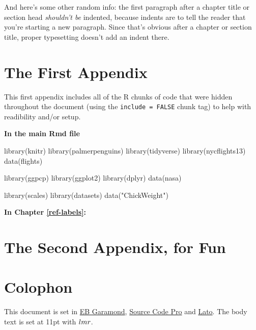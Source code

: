 \documentclass[print]{nuthesis}
\newenvironment{Shaded}{\begin{snugshade}}{\end{snugshade}}
\newcommand{\FunctionTok}[1]{\textcolor[rgb]{0.00,0.00,0.00}{#1}}
\newcommand{\NormalTok}[1]{#1}
\newcommand{\StringTok}[1]{\textcolor[rgb]{0.31,0.60,0.02}{#1}}
\begin{document}
And here's some other random info: the first paragraph after a chapter title or section head \emph{shouldn't be} indented, because indents are to tell the reader that you're starting a new paragraph. Since that's obvious after a chapter or section title, proper typesetting doesn't add an indent there.

\appendix

\hypertarget{the-first-appendix}{%
\chapter{The First Appendix}\label{the-first-appendix}}

This first appendix includes all of the R chunks of code that were hidden throughout the document (using the \texttt{include\ =\ FALSE} chunk tag) to help with readibility and/or setup.

\textbf{In the main Rmd file}

\begin{Shaded}
\begin{Highlighting}[]
\FunctionTok{library}\NormalTok{(knitr)}
\FunctionTok{library}\NormalTok{(palmerpenguins)}
\FunctionTok{library}\NormalTok{(tidyverse)}
\FunctionTok{library}\NormalTok{(nycflights13)}
\FunctionTok{data}\NormalTok{(flights)}

\FunctionTok{library}\NormalTok{(ggpcp)}
\FunctionTok{library}\NormalTok{(ggplot2)}
\FunctionTok{library}\NormalTok{(dplyr)}
\FunctionTok{data}\NormalTok{(nasa)}

\FunctionTok{library}\NormalTok{(scales)}
\FunctionTok{library}\NormalTok{(datasets)}
\FunctionTok{data}\NormalTok{(}\StringTok{"ChickWeight"}\NormalTok{)}
\end{Highlighting}
\end{Shaded}

\textbf{In Chapter \ref{ref-labels}:}

\hypertarget{the-second-appendix-for-fun}{%
\chapter{The Second Appendix, for Fun}\label{the-second-appendix-for-fun}}

\hypertarget{colophon}{%
\chapter*{Colophon}\label{colophon}}

This document is set in \href{https://github.com/georgd/EB-Garamond}{EB Garamond}, \href{https://github.com/adobe-fonts/source-code-pro/}{Source Code Pro} and \href{http://www.latofonts.com/lato-free-fonts/}{Lato}. The body text is set at 11pt with \(\familydefault\).
\end{document}
